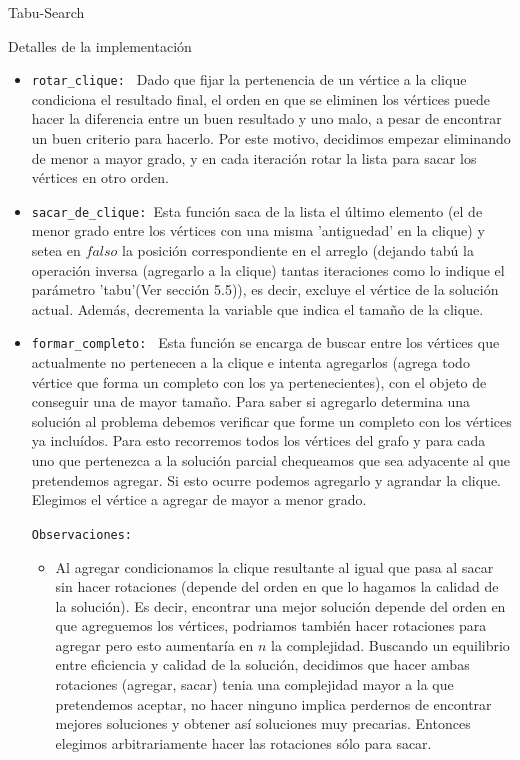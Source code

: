 \begin{section}{Tabu-Search}
\begin{subsection}{Detalles de la implementación}
\begin{itemize}
			Para setear el grado de un vértice $i$ tenemos un contador inicializado en $cero$. Recorremos la columna de la matriz de adyacencia correspondiente a dicho vértice e incrementamos el contador por cada posición $(i,j)$ igual $uno$.	

			\item \texttt{rotar\_clique: } Dado que fijar la pertenencia de un vértice a la clique condiciona el resultado final, el orden en que se eliminen los vértices puede hacer la diferencia entre un buen resultado y uno malo, a pesar de encontrar un buen criterio para hacerlo. Por este motivo, decidimos empezar eliminando de menor a mayor grado, y en cada iteración rotar la lista para sacar los vértices en otro orden.
			
			\item \texttt{sacar\_de\_clique: }Esta función saca de la lista el último elemento (el de menor grado entre los vértices con una misma 'antiguedad' en la clique) y setea en $falso$ la posición correspondiente en el arreglo (dejando tabú la operación inversa (agregarlo a la clique) tantas iteraciones como lo indique el parámetro 'tabu'(Ver sección 5.5)), es decir, excluye el vértice de la solución actual. Además, decrementa la variable que indica el tamaño de la clique.
			
			\item \texttt{formar\_completo: } Esta función se encarga de buscar entre los vértices que actualmente no pertenecen a la clique e intenta agregarlos (agrega todo vértice que forma un completo con los ya pertenecientes), con el objeto de conseguir una de mayor tamaño. Para saber si agregarlo determina una solución al problema debemos verificar que forme un completo con los vértices ya incluídos. Para esto recorremos todos los vértices del grafo y para cada uno que pertenezca a la solución parcial chequeamos que sea adyacente al que pretendemos agregar. Si esto ocurre podemos agregarlo y agrandar la clique. Elegimos el vértice a agregar de mayor a menor grado.
			
			\texttt{Observaciones: }
			\begin{itemize}
				\item Al agregar condicionamos la clique resultante al igual que pasa al sacar sin hacer rotaciones (depende del orden en que lo hagamos la calidad de la solución). Es decir, encontrar una mejor solución depende del orden en que agreguemos los vértices, podriamos también hacer rotaciones para agregar pero esto aumentaría en $n$ la complejidad. Buscando un equilibrio entre eficiencia y calidad de la solución, decidimos que hacer ambas rotaciones (agregar, sacar) tenia una complejidad mayor a la que pretendemos aceptar, no hacer ninguno implica perdernos de encontrar mejores soluciones y obtener así soluciones muy precarias. Entonces elegimos arbitrariamente hacer las rotaciones sólo para sacar.


\end{itemize}
\end{itemize}
\end{subsection}
\end{section}
